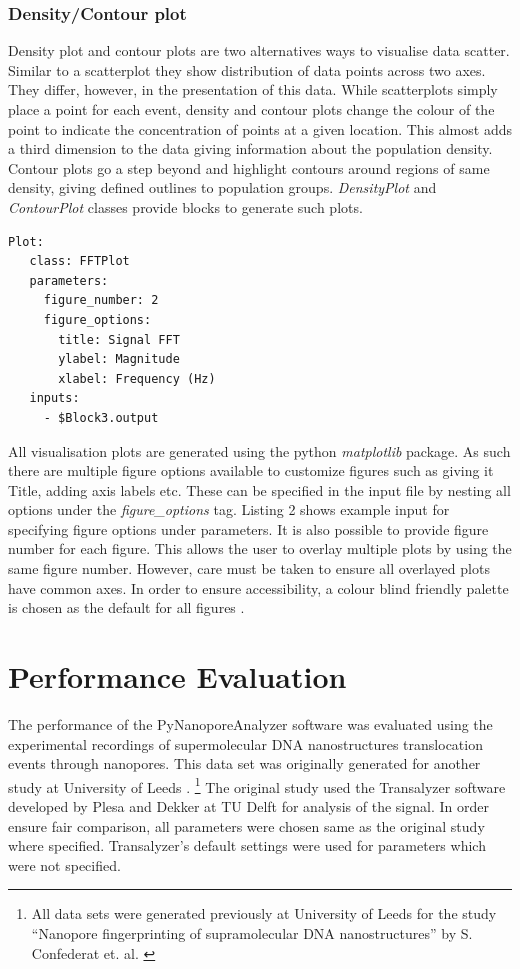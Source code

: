 \documentclass[journal]{IEEEtran}
\begin{document}
\subsubsection{Density/Contour plot}
Density plot and contour plots are two alternatives ways to visualise data scatter. Similar to a scatterplot they show distribution of data points across two axes. They differ, however, in the presentation of this data. While scatterplots simply place a point for each event, density and contour plots change the colour of the point to indicate the concentration of points at a given location. This almost adds a third dimension to the data giving information about the population density. Contour plots go a step beyond and highlight contours around regions of same density, giving defined outlines to population groups. \textit{DensityPlot} and \textit{ContourPlot} classes provide blocks to generate such plots.  

\begin{lstlisting}[caption={Specifying Figure Options Example}]
Plot:
   class: FFTPlot
   parameters:
     figure_number: 2
     figure_options:
       title: Signal FFT
       ylabel: Magnitude
       xlabel: Frequency (Hz)
   inputs:
     - $Block3.output
\end{lstlisting}

All visualisation plots are generated using the python \textit{matplotlib} package. As such there are multiple figure options available to customize figures such as giving it Title, adding axis labels etc. These can be specified in the input file by nesting all options under the \textit{figure\_options} tag. Listing 2 shows example input for specifying figure options under parameters. It is also possible to provide figure number for each figure. This allows the user to overlay multiple plots by using the same figure number. However, care must be taken to ensure all overlayed plots have common axes. In order to ensure accessibility, a colour blind friendly palette is chosen as the default for all figures \cite{ichiharaColorUniversalDesign2008}.

\section{Performance Evaluation}
The performance of the PyNanoporeAnalyzer software was evaluated using the experimental recordings of supermolecular DNA nanostructures translocation events through nanopores. This data set was originally generated for another study at University of Leeds \cite{confederatNanoporeFingerprintingSupramolecular2022}. \footnote[1]{All data sets  were generated previously at University of Leeds for the study “Nanopore fingerprinting of supramolecular DNA nanostructures” by S. Confederat et. al. \cite{confederatNanoporeFingerprintingSupramolecular2022}} The original study used the Transalyzer software developed by Plesa and Dekker at TU Delft \cite{plesaDataAnalysisMethods2015} for analysis of the signal. In order ensure fair comparison, all parameters were chosen same as the original study where specified. Transalyzer's default settings were used for parameters which were not specified. 
\end{document}
